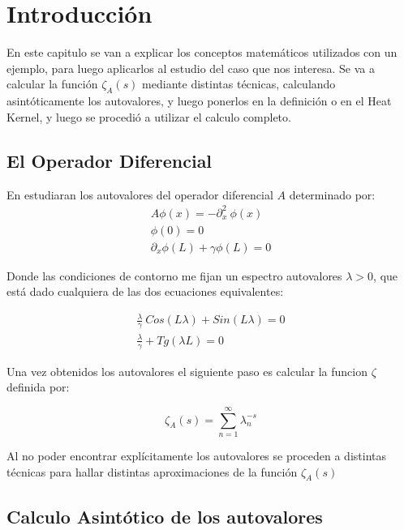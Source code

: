 \chapter{Introducción}

    En este capitulo se van a explicar los conceptos matemáticos utilizados con un ejemplo, para luego aplicarlos al estudio del caso que nos interesa. Se va a calcular la función $\zeta _A (s)$ mediante distintas técnicas, calculando asintóticamente los autovalores, y luego ponerlos en la definición o en el Heat Kernel, y luego se procedió a utilizar el calculo completo.

\section{El Operador Diferencial}

En estudiaran los autovalores del operador diferencial $A$ determinado por:
\begin{equation}
\begin{array}{c}
    A \phi (x) = - \partial ^2 _x \ \phi (x)  \\
    \phi (0) = 0 \\ 
    \partial _x \phi (L) + \gamma \phi (L) = 0
\end{array}
\end{equation}

Donde las condiciones de contorno me fijan un espectro autovalores $\lambda > 0 $, que está dado cualquiera de las dos ecuaciones equivalentes: 

\begin{equation}
\begin{array}{cc}
    \frac{\lambda}{\gamma}  \ Cos( L \lambda ) +   Sin( L \lambda ) = 0 \\
    \frac{\lambda}{\gamma}  + Tg(\lambda L )  = 0 
\label{autovalores}
\end{array}
\end{equation}

Una vez obtenidos los autovalores el siguiente paso es calcular la funcion $\zeta$ definida por:

\begin{equation}
    \zeta _ {A } (s) = \sum_{n = 1} ^{ \infty } \lambda _n ^ {-s}
\end{equation}

Al no poder encontrar explícitamente los autovalores se proceden a distintas técnicas para hallar distintas aproximaciones de la función $\zeta _A (s)$

\section{Calculo Asintótico de los autovalores}


